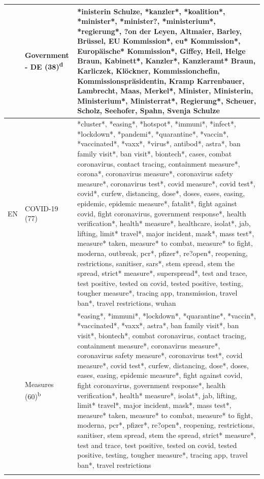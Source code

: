 \documentclass[
]{ccr}
\begin{document}
{\begin{spacing}{.9}
\begin{longtable}[]{@{}
  >{\raggedright\arraybackslash}p{.09\linewidth}
  >{\raggedright\arraybackslash}p{.12\linewidth}
  >{\raggedright\arraybackslash}p{.71\linewidth}@{}}
& Government - DE (38)\textsuperscript{d} &
*inisterin Schulze, *kanzler*, *koalition*,
*minister*, *minister?, *ministerium*, *regierung*, ?on der Leyen,
Altmaier, Barley, Brüssel, EU Kommission*, eu* Kommission*, Europäische*
Kommission*, Giffey, Heil, Helge Braun, Kabinett*, Kanzler*, Kanzleramt*
Braun, Karliczek, Klöckner, Kommissionchefin, Kommissionspräsidentin,
Kramp Karrenbauer, Lambrecht, Maas, Merkel*, Minister, Ministerin,
Ministerium*, Ministerrat*, Regierung*, Scheuer, Scholz, Seehofer,
Spahn, Svenja Schulze \\ \cline{1-3}

EN & COVID-19 (77) & *cluster*, *easing*, *hotspot*, *immuni*,
*infect*, *lockdown*, *pandemi*, *quarantine*, *vaccin*, *vaccinated*,
*vaxx*, *virus*, antibod*, astra*, ban family visit*, ban visit*,
biontech*, cases, combat coronavirus, contact tracing, containment
measure*, corona*, coronavirus measure*, coronavirus safety measure*,
coronavirus test*, covid measure*, covid test*, covid*, curfew,
distancing, dose*, doses, eases, easing, epidemic, epidemic measure*,
fatalit*, fight against covid, fight coronavirus, government response*,
health verification*, health* measure*, healthcare, isolat*, jab,
lifting, limit* travel*, major incident, mask*, mass test*, measure*
taken, measure* to combat, measure* to fight, moderna, outbreak, pcr*,
pfizer*, re?open*, reopening, restrictions, sanitiser, sars*, stem
spread, stem the spread, strict* measure*, superspread*, test and trace,
test positive, tested on covid, tested positive, testing, tougher
measure*, tracing app, transmission, travel ban*, travel restrictions,
wuhan \\ \cline{2-3}
& Measures (60)\textsuperscript{b} & *easing*, *immuni*, *lockdown*,
*quarantine*, *vaccin*, *vaccinated*, *vaxx*, astra*, ban family visit*,
ban visit*, biontech*, combat coronavirus, contact tracing, containment
measure*, coronavirus measure*, coronavirus safety measure*, coronavirus
test*, covid measure*, covid test*, curfew, distancing, dose*, doses,
eases, easing, epidemic measure*, fight against covid, fight
coronavirus, government response*, health verification*, health*
measure*, isolat*, jab, lifting, limit* travel*, major incident, mask*,
mass test*, measure* taken, measure* to combat, measure* to fight,
moderna, pcr*, pfizer*, re?open*, reopening, restrictions, sanitiser,
stem spread, stem the spread, strict* measure*, test and trace, test
positive, tested on covid, tested positive, testing, tougher measure*,
tracing app, travel ban*, travel restrictions \\ \cline{2-3}

\end{longtable}
\end{spacing}}
\end{document}
